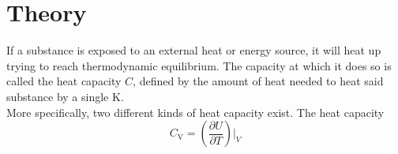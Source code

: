 \section{Theory}
\label{sec:theorie}

If a substance is exposed to an external heat or energy source,
it will heat up trying to reach thermodynamic equilibrium.
The capacity at which it does so is called the heat capacity
$C$, defined by the amount of heat needed to heat said substance by a single
$\si{\kelvin}$. \\

More specifically, two different kinds of heat capacity exist.
The heat capacity 
\begin{equation}
    C_\text{V} = \left( \frac{\partial U}{\partial T} \right) \big \vert _V
\end{equation}